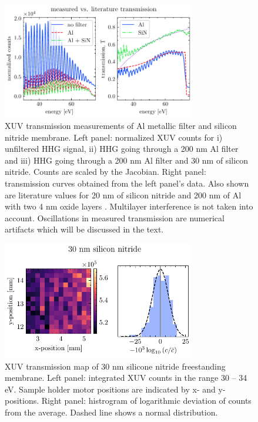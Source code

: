\begin{figure}
	\centering
	\includegraphics[width=0.75\textwidth]{figures/chap4/SiN_Al_transmission.pdf}
	\caption{XUV transmission measurements of Al metallic filter and silicon nitride membrane. Left panel: normalized XUV counts for i) unfiltered HHG signal, ii) HHG going through a 200 nm Al filter and iii) HHG going through a 200 nm Al filter and 30 nm of silicon nitride. Counts are scaled by the Jacobian. Right panel: transmission curves obtained from the left panel's data. Also shown are literature values for 20 nm of silicon nitride and 200 nm of Al with two 4 nm oxide layers \cite{gulliksonCXROXRayInteractions}. Multilayer interference is not taken into account. Oscillations in measured transmission are numerical artifacts which will be discussed in the text.}
	\label{fig:SiN_Al_transmission}
\end{figure}

\begin{figure}
	\centering
	\includegraphics[width=0.75\textwidth]{figures/chap4/nitride_map.pdf}
	\caption{XUV transmission map of 30 nm silicone nitride freestanding membrane. Left panel: integrated XUV counts in the range 30 -- 34 eV. Sample holder motor positions are indicated by x- and y-positions. Right panel: histrogram of logarithmic deviation of counts from the average. Dashed line shows a normal distribution.}
	\label{fig:nitride_map}
\end{figure}


